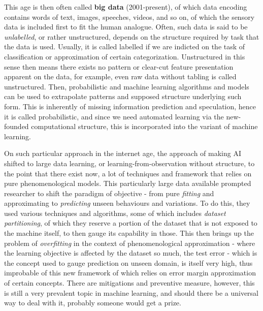 This age is then often called \textbf{big data} (2001-present), of which data encoding contains words of text, images, speeches, videos, and so on, of which the sensory data is included first to fit the human analogue. Often, such data is said to be \textit{unlabelled}, or rather unstructured, depends on the structure required by task that the data is used. Usually, it is called labelled if we are indicted on the task of classification or approximation of certain categorization. Unstructured in this sense then means there exists no pattern or clear-cut feature presentation apparent on the data, for example, even raw data without tabling is called unstructured. Then, probabilistic and machine learning algorithms and models can be used to extrapolate patterns and supposed structure underlying such form. This is inherently of missing information prediction and speculation, hence it is called probabilistic, and since we need automated learning via the new-founded computational structure, this is incorporated into the variant of machine learning. 

On such particular approach in the internet age, the approach of making AI shifted to large data learning, or learning-from-observation without structure, to the point that there exist now, a lot of techniques and framework that relies on pure phenomenological models. This particularly large data available prompted researcher to shift the paradigm of objective - from pure \textit{fitting} and approximating to \textit{predicting} unseen behaviours and variations. To do this, they used various techniques and algorithms, some of which includes \textit{dataset partitioning}, of which they reserve a portion of the dataset that is not exposed to the machine itself, to then gauge its capability in those. This then brings up the problem of \textit{overfitting} in the context of phenomenological approximation - where the learning objective is affected by the dataset so much, the test error - which is the concept used to gauge prediction on unseen domain, is itself very high, thus improbable of this new framework of which relies on error margin approximation of certain concepts. There are mitigations and preventive measure, however, this is still a very prevalent topic in machine learning, and should there be a universal way to deal with it, probably someone would get a prize. 


